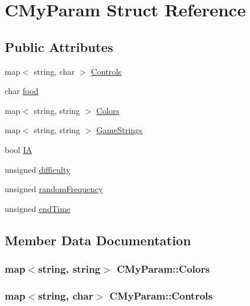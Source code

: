 \hypertarget{struct_c_my_param}{}\section{C\+My\+Param Struct Reference}
\label{struct_c_my_param}
\subsection*{Public Attributes}
\begin{DoxyCompactItemize}
\item 
map$<$ string, char $>$ \hyperlink{struct_c_my_param_ac8cbc4799636b69d4a1262671c7d6b6d}{Controls}
\item 
char \hyperlink{struct_c_my_param_a4df5fa144f6e427e038fac7fbd28e6d7}{food}
\item 
map$<$ string, string $>$ \hyperlink{struct_c_my_param_a5d421abb0e990e5845f6257452b08612}{Colors}
\item 
map$<$ string, string $>$ \hyperlink{struct_c_my_param_a14680b6b2da1e5d7d4c580d290bd1d4b}{Game\+Strings}
\item 
bool \hyperlink{struct_c_my_param_a56420b1ed8e44615fd5ae20c86ba7a6c}{IA}
\item 
unsigned \hyperlink{struct_c_my_param_a3848248ca913f8abff022ca7e9de4219}{difficulty}
\item 
unsigned \hyperlink{struct_c_my_param_a7492c88f87a6eb26f15c7e4008c38519}{random\+Frequency}
\item 
unsigned \hyperlink{struct_c_my_param_a3afeb99110158c6cf4d68ad5246f0043}{end\+Time}
\end{DoxyCompactItemize}


\subsection{Member Data Documentation}
\subsubsection[{\texorpdfstring{Colors}{Colors}}]{\setlength{\rightskip}{0pt plus 5cm}map$<$string, string$>$ C\+My\+Param\+::\+Colors}\hypertarget{struct_c_my_param_a5d421abb0e990e5845f6257452b08612}{}\label{struct_c_my_param_a5d421abb0e990e5845f6257452b08612}
\subsubsection[{\texorpdfstring{Controls}{Controls}}]{\setlength{\rightskip}{0pt plus 5cm}map$<$string, char$>$ C\+My\+Param\+::\+Controls}\hypertarget{struct_c_my_param_ac8cbc4799636b69d4a1262671c7d6b6d}{}\label{struct_c_my_param_ac8cbc4799636b69d4a1262671c7d6b6d}
